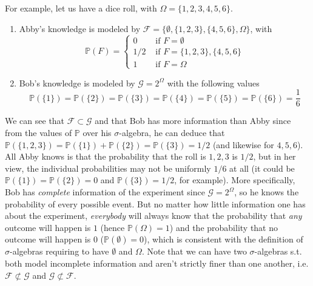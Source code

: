 \documentclass{article}
\begin{document}
      For example, let us have a dice roll, with $\Omega = \{1, 2, 3, 4, 5, 6\}$.
      \begin{enumerate}
        \item Abby's knowledge is modeled by $\mathcal{F} = \{\emptyset, \{1, 2, 3\}, \{4, 5, 6\}, \Omega\}$, with 
        \begin{equation}
          \mathbb{P}(F) = \begin{cases} 
            0 & \text{ if } F = \emptyset \\
            1/2 & \text{ if } F = \{1, 2, 3\}, \{4, 5, 6\} \\ 
            1 & \text{ if } F = \Omega \end{cases}
        \end{equation}
        \item Bob's knowledge is modeled by $\mathcal{G} = 2^\Omega$ with the following values 
        \begin{equation}
          \mathbb{P}(\{1\}) = \mathbb{P}(\{2\}) = \mathbb{P}(\{3\}) = \mathbb{P}(\{4\}) = \mathbb{P}(\{5\}) = \mathbb{P}(\{6\}) = \frac{1}{6}
        \end{equation}
      \end{enumerate}
      We can see that $\mathcal{F} \subset \mathcal{G}$ and that Bob has more information than Abby since from the values of $\mathbb{P}$ over his $\sigma$-algebra, he can deduce that $\mathbb{P}(\{1, 2, 3\}) = \mathbb{P}(\{1\}) + \mathbb{P}(\{2\}) = \mathbb{P}(\{3\}) = 1/2$ (and likewise for $4, 5, 6$). All Abby knows is that the probability that the roll is $1, 2, 3$ is $1/2$, but in her view, the individual probabilities may not be uniformly $1/6$ at all (it could be $\mathbb{P}(\{1\}) = \mathbb{P}(\{2\}) = 0$ and $\mathbb{P}(\{3\}) = 1/2$, for example). More specifically, Bob has \textit{complete} information of the experiment since $\mathcal{G} = 2^\Omega$, so he knows the probability of every possible event. But no matter how little information one has about the experiment, \textit{everybody} will always know that the probability that \textit{any} outcome will happen is $1$ (hence $\mathbb{P}(\Omega) = 1$) and the probability that no outcome will happen is $0$ ($\mathbb{P}(\emptyset) = 0$), which is consistent with the definition of $\sigma$-algebras requiring to have $\emptyset$ and $\Omega$. Note that we can have two $\sigma$-algebras s.t. both model incomplete information and aren't strictly finer than one another, i.e. $\mathcal{F} \not\subset \mathcal{G}$ and $\mathcal{G} \not\subset \mathcal{F}$. 
\end{document}
